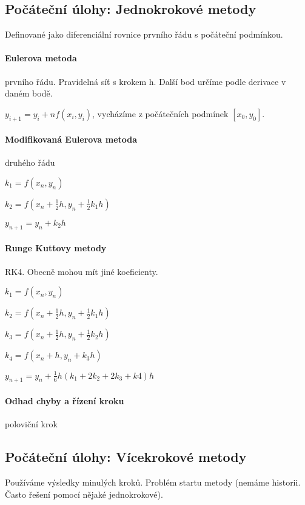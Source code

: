 \documentclass[a4paper, 11pt]{report}
\begin{document}
\subsection{Počáteční úlohy: Jednokrokové metody}

Definované jako diferenciální rovnice prvního řádu s počáteční podmínkou.

\paragraph{Eulerova metoda} prvního řádu. Pravidelná síť s krokem h. Další bod určíme podle derivace v daném bodě.

$y_{i+1} = y_i + n f(x_i, y_i)$, vycházíme z počátečních podmínek $[x_0, y_0]$.

\paragraph{Modifikovaná Eulerova metoda} druhého řádu

$k_1 = f(x_n, y_n)$

$k_2 = f(x_n + \frac{1}{2}h, y_n + \frac{1}{2} k_1 h)$

$y_{n+1} = y_n + k_2 h$

\paragraph{Runge Kuttovy metody} RK4. Obecně mohou mít jiné koeficienty.

$k_1 = f(x_n, y_n)$

$k_2 = f(x_n + \frac{1}{2}h, y_n + \frac{1}{2} k_1 h)$

$k_3 = f(x_n + \frac{1}{2}h, y_n + \frac{1}{2} k_2 h)$

$k_4 = f(x_n + h, y_n + k_3 h)$

$y_{n+1} = y_n + \frac{1}{6} h \left( k_1 + 2k_2 + 2k_3 + k4 \right) h$

\paragraph{Odhad chyby a řízení kroku} poloviční krok

\subsection{Počáteční úlohy: Vícekrokové metody}
Používáme výsledky minulých kroků. Problém startu metody (nemáme historii. Často řešení pomocí nějaké jednokrokové).
\end{document}
